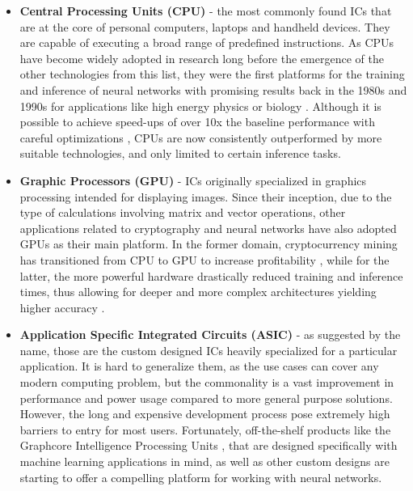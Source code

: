 \begin{itemize}
  \item \textbf{Central Processing Units (CPU)} - the most commonly found ICs that are at the core of personal computers, laptops and handheld devices. They are capable of executing a broad range of predefined instructions. As CPUs have become widely adopted in research long before the emergence of the other technologies from this list, they were the first platforms for the training and inference of neural networks with promising results back in the 1980s and 1990s for applications like high energy physics \cite{17-dagli1989applications} or biology \cite{16-wu1995neural}. Although it is possible to achieve speed-ups of over 10x the baseline performance with careful optimizations \cite{nn_cpu_optim}, CPUs are now consistently outperformed by more suitable technologies, and only limited to certain inference tasks.

  \item \textbf{Graphic Processors (GPU)} - ICs originally specialized in graphics processing intended for displaying images. Since their inception, due to the type of calculations involving matrix and vector operations, other applications related to cryptography and neural networks have also adopted GPUs as their main platform. In the former domain, cryptocurrency mining has transitioned from CPU to GPU to increase profitability \cite{19-iyer2018gpu}, while for the latter, the more powerful hardware drastically reduced training and inference times, thus allowing for deeper and more complex architectures yielding higher accuracy \cite{20-chen2020gpu-accelerated, 21-zhang2019recent}.

  \item \textbf{Application Specific Integrated Circuits (ASIC)} - as suggested by the name, those are the custom designed ICs heavily specialized for a particular application. It is hard to generalize them, as the use cases can cover any modern computing problem, but the commonality is a vast improvement in performance and power usage compared to more general purpose solutions. However, the long and expensive development process pose extremely high barriers to entry for most users. Fortunately, off-the-shelf products like the Graphcore Intelligence Processing Units \cite{22-graphcoregraphcore}, that are designed specifically with machine learning applications in mind, as well as other custom designs \cite{23-knag2015sparse, 24-ramanaiah2011asic} are starting to offer a compelling platform for working with neural networks.


\end{itemize}
